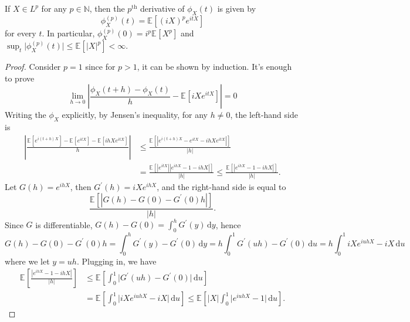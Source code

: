\begin{theorem}\label{thm:characteristic-function-derivative}
	If \(X \in L ^p\) for any \(p \in \mathbb{N} \), then the \(p^{\text{th} }\) derivative of \(\phi _X(t)\) is given by
	\[
		\phi _X^{(p)} (t) = \mathbb{E}_{}[(iX)^p e^{itX}]
	\]
	for every \(t\). In particular, \(\phi _X^{(p)}(0) = i^p \mathbb{E}_{}[X^p] \) and \(\sup _t \vert \phi _X^{(p)} (t) \vert \leq \mathbb{E}_{}[\vert X \vert ^p] < \infty \).
\end{theorem}
\begin{proof}
	Consider \(p = 1\) since for \(p > 1\), it can be shown by induction. It's enough to prove
	\[
		\lim_{h \to 0} \left\vert \frac{\phi _X(t + h) - \phi _X(t)}{h} - \mathbb{E}_{}\left[i X e^{itX}\right] \right\vert = 0
	\]
	Writing the \(\phi _X\) explicitly, by Jensen's inequality, for any \(h \neq 0\), the left-hand side is
	\[
		\begin{split}
			\left\vert \frac{\mathbb{E}_{}\left[e^{i(t + h) X}\right] - \mathbb{E}_{}\left[e^{itX}\right] - \mathbb{E}_{}\left[ihX e^{itX}\right] }{h} \right\vert
			 & \leq \frac{\mathbb{E}_{}\left[\left\vert e^{i(t + h) X} - e^{itX} - ihX e^{itX} \right\vert \right] }{\vert h \vert }             \\
			 & = \frac{\mathbb{E}_{}\left[\left\vert e^{i t X}  \right\vert \left\vert e^{i h X} - 1 - ihX \right\vert \right] }{\vert h \vert }
			\leq \frac{\mathbb{E}_{}\left[\left\vert e^{i h X} - 1 - ihX \right\vert \right] }{\vert h \vert }.
		\end{split}
	\]
	Let \(G(h) = e^{ihX}\), then \(G^{\prime} (h) = iX e^{ihX}\), and the right-hand side is equal to
	\[
		\frac{\mathbb{E}_{}\left[\left\vert G(h) - G(0) - G^{\prime} (0) h \right\vert \right]}{\vert h \vert } .
	\]
	Since \(G\) is differentiable, \(G(h)-G(0) = \int_{0}^{h} G^{\prime} (y) \,\mathrm{d}y \), hence
	\[
		G(h) - G(0) - G^{\prime} (0) h
		= \int_{0}^{h} G^{\prime} (y) - G^{\prime} (0) \,\mathrm{d}y
		= h \int_{0}^{1} G^{\prime} (uh) - G^{\prime} (0) \,\mathrm{d}u
		= h \int_{0}^{1} iX e^{iuhX} - iX \,\mathrm{d}u
	\]
	where we let \(y = u h\). Plugging in, we have
	\[
		\begin{split}
			\mathbb{E}_{}\left[\frac{\left\vert e^{ihX} - 1 - ihX \right\vert }{\vert h \vert }\right]
			 & \leq \mathbb{E}_{}\left[\int_{0}^{1} \vert G^{\prime} (uh) - G^{\prime} (0) \vert \,\mathrm{d}u \right] \\
			 & = \mathbb{E}_{}\left[\int_{0}^{1} \vert iX e^{iuhX} - iX \vert \,\mathrm{d}u \right]
			\leq \mathbb{E}_{}\left[\vert X \vert \int_{0}^{1} \vert e^{iuhX} - 1 \vert \,\mathrm{d}u \right].

\end{split}\]
\end{proof}
